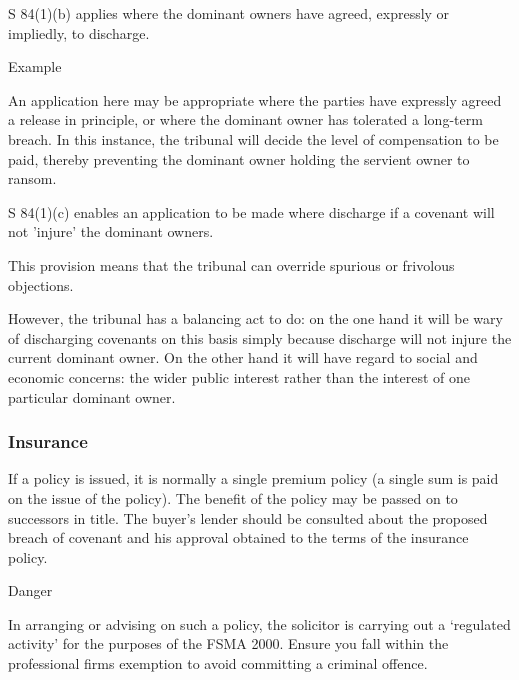 \documentclass[
]{article}
\newenvironment{env-633e2c1a-5d4f-4828-b85f-3631067ba172}
{
    \savenotes\tcolorbox[blanker,breakable,left=5pt,borderline west={2pt}{-4pt}{firebrick}]
}
{
    \endtcolorbox\spewnotes
}
\newenvironment{env-c75278ec-0f81-4db3-97b1-0452147ba646}
{
    \savenotes\tcolorbox[blanker,breakable,left=5pt,borderline west={2pt}{-4pt}{purple}]
}
{
    \endtcolorbox\spewnotes
}
\begin{document}
S 84(1)(b) applies where the dominant owners have agreed, expressly or
impliedly, to discharge.

\begin{env-c75278ec-0f81-4db3-97b1-0452147ba646}

Example

An application here may be appropriate where the parties have expressly
agreed a release in principle, or where the dominant owner has tolerated
a long-term breach. In this instance, the tribunal will decide the level
of compensation to be paid, thereby preventing the dominant owner
holding the servient owner to ransom.

\end{env-c75278ec-0f81-4db3-97b1-0452147ba646}

S 84(1)(c) enables an application to be made where discharge if a
covenant will not 'injure' the dominant owners.

This provision means that the tribunal can override spurious or
frivolous objections.

However, the tribunal has a balancing act to do: on the one hand it will
be wary of discharging covenants on this basis simply because discharge
will not injure the current dominant owner. On the other hand it will
have regard to social and economic concerns: the wider public interest
rather than the interest of one particular dominant owner.

\hypertarget{insurance}{%
\subsubsection{Insurance}\label{insurance}}

If a policy is issued, it is normally a single premium policy (a single
sum is paid on the issue of the policy). The benefit of the policy may
be passed on to successors in title. The buyer's lender should be
consulted about the proposed breach of covenant and his approval
obtained to the terms of the insurance policy.

\begin{env-633e2c1a-5d4f-4828-b85f-3631067ba172}

Danger

In arranging or advising on such a policy, the solicitor is carrying out
a `regulated activity' for the purposes of the FSMA 2000. Ensure you
fall within the professional firms exemption to avoid committing a
criminal offence.

\end{env-633e2c1a-5d4f-4828-b85f-3631067ba172}
\end{document}
